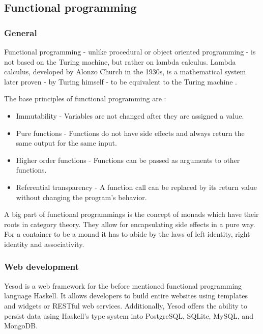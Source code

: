 \documentclass[a4paper]{article}
\begin{document}
\subsection{Functional programming}
\subsubsection{General}

Functional programming - unlike procedural or object oriented programming - is not based on the Turing machine,
but rather on lambda calculus. Lambda calculus, developed by Alonzo Church in the 1930s, is a mathematical system
later proven - by Turing himself - to be equivalent to the Turing machine \cite{turing1937computability}.\newline

\noindent The base principles of functional programming are \cite{hughes1989functional}:
\begin{itemize}
	\item Immutability - Variables are not changed after they are assigned a value.
	\item Pure functions - Functions do not have side effects and always return the same output for the same input.
	\item Higher order functions - Functions can be passed as arguments to other functions.
	\item Referential transparency - A function call can be replaced by its return value without changing the program's behavior.
\end{itemize}

\noindent A big part of functional programmings is the concept of monads which have their roots in category theory.
They allow for encapsulating side effects in a pure way. For a container to be a monad
it has to abide by the laws of left identity, right identity and associativity. \cite{wadler1992essence}

\subsubsection{Web development}

Yesod is a web framework for the before mentioned functional programming language Haskell.
It allows developers to build entire websites using templates and widgets or RESTful web services.
Additionally, Yesod offers the ability to persist data using Haskell's type system into
PostgreSQL, SQLite, MySQL, and MongoDB. \cite{snoyman2015developing}
\end{document}
